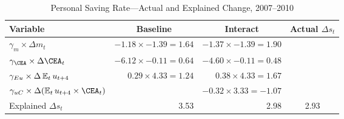   
\begin{table}
\caption{ Personal Saving Rate---Actual and Explained Change, 2007--2010} \label{tPred} 
\begin{center}
\begin{tabular}{@{}lrrc@{}}\\
\toprule
     Variable & \multicolumn{1}{c}{Baseline }& \multicolumn{1}{c}{Interact }& \multicolumn{1}{c}{Actual $\Delta s_t$ }\\
\midrule 
$\gamma_m\times\Delta m_t$ & $ -1.18 \times -1.39 = 1.64 $ & $ -1.37 \times -1.39 = 1.90 $ & \\
$\gamma_\CEA\times\Delta \CEA_t$ & $ -6.12 \times -0.11 = 0.64 $ & $ -4.60 \times -0.11 = 0.48 $ &  \\
$\gamma_{Eu}\times\Delta \operatorname{\mathbb{E}}_t u_{t+4} $ & $ 0.29 \times 4.33 = 1.24 $ & $ 0.38 \times 4.33 = 1.67 $ & \\
$\gamma_{uC}\times\Delta (\Ex_t u_{t+4}\times\CEA_t) $ &  & $ -0.32 \times 3.33 = -1.07 $ &  \\\midrule
Explained $\Delta s_t$ &  3.53 &  2.98 & 2.93\\
\bottomrule
\end{tabular}
\end{center}
\end{table} 
